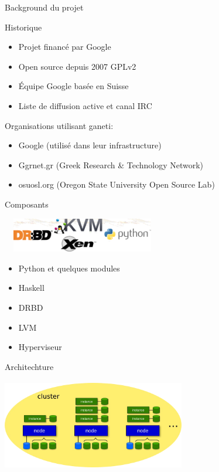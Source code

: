 \begin{frame}{Background du projet}
\begin{block}{Historique}
  \begin{itemize}
  \item Projet financé par Google
\pause
  \item Open source depuis 2007 GPLv2
\pause
  \item Équipe Google basée en Suisse
\pause
  \item Liste de diffusion active et canal IRC
\pause
  \end{itemize}
\end{block}
\begin{block}{Organisations utilisant ganeti:}
  \begin{itemize}
  \item Google (utilisé dans leur infrastructure)
\pause
  \item Ggrnet.gr (Greek Research \& Technology Network)
\pause
  \item osuosl.org (Oregon State University Open Source Lab)
  \end{itemize}
\end{block}
\end{frame}

\begin{frame}{Composants}
\begin{center}
  \includegraphics[width=7cm,height=1.5cm]{images_presentation/module.png}
\end{center}
\begin{itemize}
\item Python et quelques modules
\item Haskell
\item DRBD
\item LVM
\item Hyperviseur
\end{itemize}
\end{frame}

\begin{frame}{Architechture}
\begin{center}
  \includegraphics[width=8cm,height=4cm]{images_presentation/archi1.png}
\end{center}
\end{frame}

